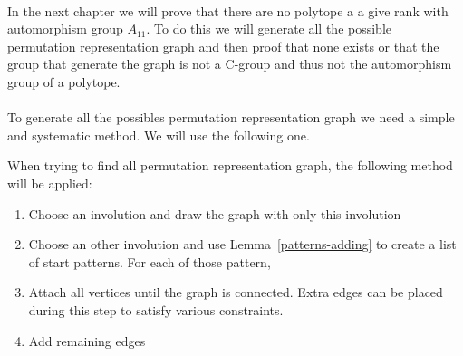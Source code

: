 \paragraph{}
In the next chapter we will prove that there are no polytope a a give rank with automorphism group $A_{11}$. To do this we will generate all the possible permutation representation graph and then proof that none exists or that the group that generate the graph is not a C-group and thus not the automorphism group of a polytope.

\paragraph{}
To generate all the possibles permutation representation graph we need a simple and systematic method. We will use the following one.

\begin{method}
  \label{method}
  When trying to find all permutation representation graph, the following method will be applied:

  \begin{enumerate}
    \item Choose an involution and draw the graph with only this involution
    \item Choose an other involution and use Lemma~\ref{patterns-adding} to create a list of start patterns. For each of those pattern,
    \item Attach all vertices until the graph is connected. Extra edges can be placed during this step to satisfy various constraints.
    \item Add remaining edges
  \end{enumerate}


\end{method}

